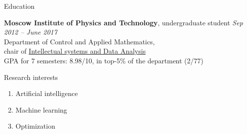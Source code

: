 \documentclass{resume} %
\begin{document}

\begin{rSection}{Education}

{\bf Moscow Institute of Physics and Technology}, undergraduate student \hfill {\em Sep 2012 -- June 2017} \\ 
Department of Control and Applied Mathematics,\\chair of \href{http://www.machinelearning.ru/}{Intellectual systems and Data Analysis}\\
GPA for 7 semesters: 8.98/10, in top-5\% of the department (2/77)

\end{rSection}


\begin{rSection}{Research interests}
\begin{enumerate}
\item Artificial intelligence
\item Machine learning
\item Optimization
\end{enumerate}
\end{rSection}
\end{document}
